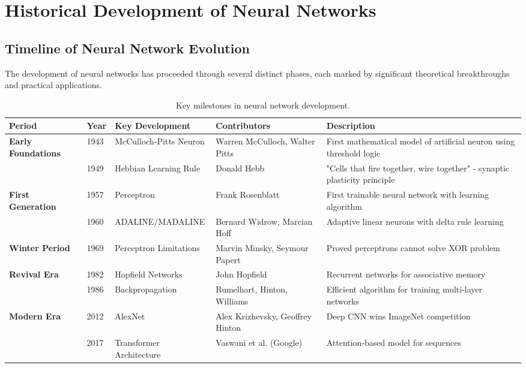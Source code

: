 \section{Historical Development of Neural Networks}

\subsection{Timeline of Neural Network Evolution}
The development of neural networks has proceeded through several distinct phases, each marked by significant theoretical breakthroughs and practical applications.

\begin{table}[h!]
\centering
\small
\begin{tabular}{|p{1.5cm}|p{1cm}|p{3.5cm}|p{2.5cm}|p{5cm}|}
\hline
\textbf{Period} & \textbf{Year} & \textbf{Key Development} & \textbf{Contributors} & \textbf{Description} \\
\hline
\textbf{Early Foundations} & 1943 & McCulloch-Pitts Neuron & Warren McCulloch, Walter Pitts & First mathematical model of artificial neuron using threshold logic \\
\hline
& 1949 & Hebbian Learning Rule & Donald Hebb & "Cells that fire together, wire together" - synaptic plasticity principle \\
\hline
\textbf{First Generation} & 1957 & Perceptron & Frank Rosenblatt & First trainable neural network with learning algorithm \\
\hline
& 1960 & ADALINE/MADALINE & Bernard Widrow, Marcian Hoff & Adaptive linear neurons with delta rule learning \\
\hline
\textbf{Winter Period} & 1969 & Perceptron Limitations & Marvin Minsky, Seymour Papert & Proved perceptrons cannot solve XOR problem \\
\hline
\textbf{Revival Era} & 1982 & Hopfield Networks & John Hopfield & Recurrent networks for associative memory \\
\hline
& 1986 & Backpropagation & Rumelhart, Hinton, Williams & Efficient algorithm for training multi-layer networks \\
\hline
\textbf{Modern Era} & 2012 & AlexNet & Alex Krizhevsky, Geoffrey Hinton & Deep CNN wins ImageNet competition \\
\hline
& 2017 & Transformer Architecture & Vaswani et al. (Google) & Attention-based model for sequences \\
\hline
\end{tabular}
\caption{Key milestones in neural network development.}
\end{table}


